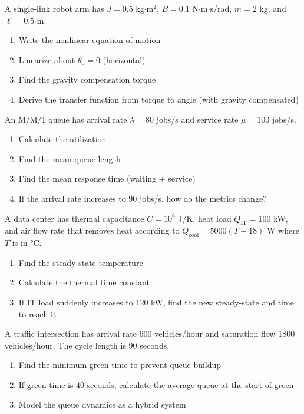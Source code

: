 \begin{exercise}
A single-link robot arm has $J = 0.5$ kg$\cdot$m$^2$, $B = 0.1$ N$\cdot$m$\cdot$s/rad, $m = 2$ kg, and $\ell = 0.5$ m.
\begin{enumerate}[label=(\alph*)]
    \item Write the nonlinear equation of motion
    \item Linearize about $\theta_0 = 0$ (horizontal)
    \item Find the gravity compensation torque
    \item Derive the transfer function from torque to angle (with gravity compensated)
\end{enumerate}
\end{exercise}

\begin{exercise}
An M/M/1 queue has arrival rate $\lambda = 80$ jobs/s and service rate $\mu = 100$ jobs/s.
\begin{enumerate}[label=(\alph*)]
    \item Calculate the utilization
    \item Find the mean queue length
    \item Find the mean response time (waiting + service)
    \item If the arrival rate increases to 90 jobs/s, how do the metrics change?
\end{enumerate}
\end{exercise}

\begin{exercise}
A data center has thermal capacitance $C = 10^6$ J/K, heat load $Q_{\text{IT}} = 100$ kW, and air flow rate that removes heat according to $\dot{Q}_{\text{cool}} = 5000(T - 18)$ W where $T$ is in °C.
\begin{enumerate}[label=(\alph*)]
    \item Find the steady-state temperature
    \item Calculate the thermal time constant
    \item If IT load suddenly increases to 120 kW, find the new steady-state and time to reach it
\end{enumerate}
\end{exercise}

\begin{exercise}
A traffic intersection has arrival rate 600 vehicles/hour and saturation flow 1800 vehicles/hour. The cycle length is 90 seconds.
\begin{enumerate}[label=(\alph*)]
    \item Find the minimum green time to prevent queue buildup
    \item If green time is 40 seconds, calculate the average queue at the start of green
    \item Model the queue dynamics as a hybrid system
\end{enumerate}
\end{exercise}

